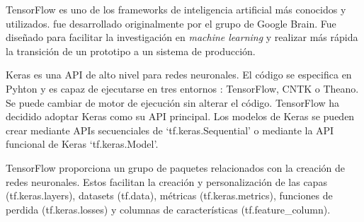 TensorFlow \cite{TensorYKeras} \cite{TensorYKeras2} es uno de los frameworks de inteligencia artificial más conocidos y utilizados. fue desarrollado originalmente por el grupo de Google Brain. Fue diseñado para facilitar la investigación en \textit{machine learning} y realizar más rápida la transición de un prototipo a un sistema de producción. 

Keras es una API de alto nivel para redes neuronales. El código se especifica en Pyhton y es capaz de ejecutarse en tres entornos : TensorFlow, CNTK o Theano. Se puede cambiar de motor de ejecución sin alterar el código. TensorFlow ha decidido adoptar Keras como su API principal. Los modelos de Keras se pueden crear mediante APIs secuenciales de `tf.keras.Sequential' o mediante la API funcional de Keras `tf.keras.Model'.

TensorFlow proporciona un grupo de paquetes relacionados con la creación de redes neuronales. Estos facilitan la creación y personalización de las capas (tf.keras.layers), datasets (tf.data), métricas (tf.keras.metrics), funciones de perdida (tf.keras.losses) y columnas de características (tf.feature\_column).


